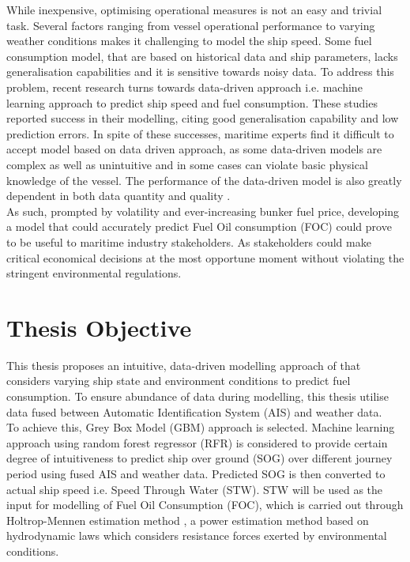 While inexpensive, optimising operational measures is not an easy and trivial task. Several factors ranging from vessel operational performance to varying weather conditions makes it challenging to model the ship speed. Some fuel consumption model, that are based on historical data and ship parameters, lacks generalisation capabilities and it is sensitive towards noisy data. To address this problem, recent research turns towards data-driven approach i.e. machine learning approach to predict ship speed and fuel consumption. These studies reported success in their modelling, citing good generalisation capability and low prediction errors. In spite of these successes, maritime experts find it difficult to accept model based on data driven approach, as some data-driven models are complex as well as unintuitive and in some cases can violate basic physical knowledge of the vessel. The performance of the data-driven model is also greatly dependent in both data quantity and quality \citep{Yan.2021,Gkerekos.2019}.\\      

As such, prompted by volatility and ever-increasing bunker fuel price, developing a model that could accurately predict Fuel Oil consumption (FOC) could prove to be useful to maritime industry stakeholders. As stakeholders could make critical economical decisions at the most opportune moment without violating the stringent environmental regulations. \\

\section{Thesis Objective}\label{sec:objectives}

This thesis proposes an intuitive, data-driven modelling approach of that considers varying ship state and environment conditions to predict fuel consumption. To ensure abundance of data during modelling, this thesis utilise data fused between Automatic Identification System (AIS) and weather data.\\

To achieve this, Grey Box Model (GBM) approach is selected. Machine learning approach using random forest regressor (RFR) is considered to provide certain degree of intuitiveness to predict ship over ground (SOG) over different journey period using fused AIS and weather data. Predicted SOG is then converted to actual ship speed i.e. Speed Through Water (STW). STW will be used as the input for modelling of Fuel Oil Consumption (FOC), which is carried out through Holtrop-Mennen estimation method \citep{Holtrop.1978,Holtrop.1982,Holtrop.1984}, a power estimation method based on hydrodynamic laws which considers resistance forces exerted by environmental conditions.\\


